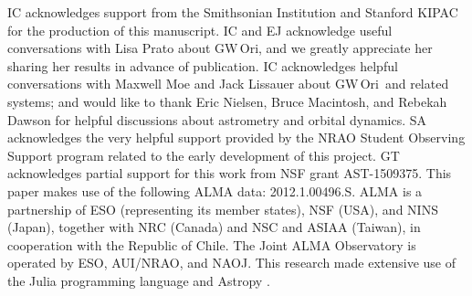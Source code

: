 \documentclass[twocolumn]{aastex61}
\newcommand{\obj}{GW\,Ori}
\begin{document}
\acknowledgments
IC acknowledges support from the Smithsonian Institution and Stanford KIPAC for the production of this manuscript. IC and EJ acknowledge useful conversations with Lisa Prato about \obj, and we greatly appreciate her sharing her results in advance of publication.  IC acknowledges helpful conversations with Maxwell Moe and Jack Lissauer about \obj\ and related systems; and would like to thank Eric Nielsen, Bruce Macintosh, and Rebekah Dawson for helpful discussions about astrometry and orbital dynamics. SA acknowledges the very helpful support provided by the NRAO Student Observing Support program related to the early development of this project. GT acknowledges partial support for this work from NSF grant AST-1509375. This paper makes use of the following ALMA data: 2012.1.00496.S. ALMA is a partnership of ESO (representing its member states), NSF (USA), and NINS (Japan), together with NRC (Canada) and NSC and ASIAA (Taiwan), in cooperation with the Republic of Chile.  The Joint ALMA Observatory is operated by ESO, AUI/NRAO, and NAOJ.  This research made extensive use of the Julia programming language \citep{bezanson17} and Astropy \citep{astropy13}.




\end{document}
